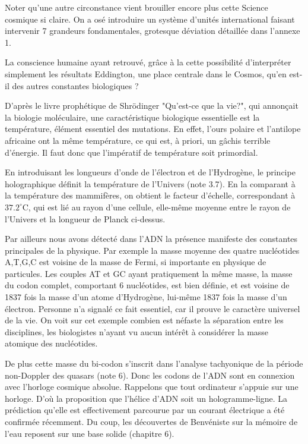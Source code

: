 \documentclass[a4paper,12pt]{article}
\begin{document}
Noter qu'une autre circonstance vient brouiller encore plus cette Science cosmique si claire. On a osé introduire un système d'unités international faisant intervenir 7 grandeurs fondamentales, grotesque déviation détaillée dans l'annexe 1. 

La conscience humaine ayant retrouvé, grâce à la cette possibilité d’interpréter simplement les résultats Eddington, une place centrale dans le Cosmos, qu'en est-il des autres constantes biologiques ?

D'après le livre prophétique de Shrödinger "Qu'est-ce que la vie?", qui annonçait la biologie moléculaire, une caractéristique biologique essentielle est la température, élément essentiel des mutations. En effet, l'ours polaire et l'antilope africaine ont la même température, ce qui est, à priori, un gâchis terrible d'énergie. Il faut donc que l'impératif de température soit primordial.

En introduisant les longueurs d'onde de l'électron et de l'Hydrogène, le principe holographique définit la température de l'Univers (note 3.7). En la comparant à la température des mammifères, on obtient le facteur d'échelle, correspondant à $37.2^{\circ}$C, qui est lié au rayon d'une cellule, elle-même moyenne entre le rayon de l'Univers et la longueur de Planck ci-dessus. 

    Par ailleurs nous avons détecté dans l'ADN la présence manifeste des constantes principales de la physique. Par exemple la masse moyenne des quatre nucléotides A,T,G,C est voisine de la masse de Fermi, si importante en physique de particules. Les couples AT et GC ayant pratiquement la même masse, la masse du codon complet, comportant 6 nucléotides, est bien définie, et est voisine de 1837 fois la masse d'un atome d'Hydrogène, lui-même 1837 fois la masse d'un électron. Personne n’a signalé ce fait essentiel, car il prouve le caractère universel de la vie. On voit sur cet exemple combien est néfaste la séparation entre les disciplines, les biologistes n’ayant vu aucun intérêt à considérer la masse atomique des nucléotides.

    De plus cette masse du bi-codon s'inscrit dans l'analyse tachyonique de la période non-Doppler des quasars (note 6). Donc les codons de l'ADN sont en connexion avec l'horloge cosmique absolue. Rappelons que tout ordinateur s'appuie sur une horloge. D'où la proposition que l'hélice d'ADN soit un hologramme-ligne. La prédiction qu'elle est effectivement parcourue par un courant électrique a été confirmée récemment. Du coup, les découvertes de Benvéniste sur la mémoire de l'eau reposent sur une base solide  (chapitre 6).
\end{document}
